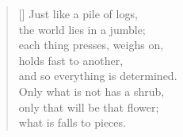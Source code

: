 \documentclass[a4paper,12pt,twoside,final]{book}
\begin{document}
\settowidth{\versewidth}{each thing constricts, presses against,}

\begin{verse}[\versewidth]
  Just like a pile of logs, \\
  the world lies in a jumble; \\
  each thing presses, weighs on, \\
  holds fast to another, \\
  and so everything is determined. \\
  Only what is not has a shrub, \\
  only that will be that flower; \\
  what is falls to pieces.
\end{verse}


\newpage

\settowidth{\versewidth}{Csak ami nincs, annak van bokra,}
\end{document}
